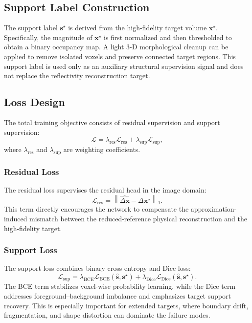 \documentclass[journal]{IEEEtran}
\begin{document}
\subsection{Support Label Construction}
\label{subsec:support_label}

The support label $\mathbf{s}^{\star}$ is derived from the high-fidelity target volume $\mathbf{x}^{\star}$. Specifically, the magnitude of $\mathbf{x}^{\star}$ is first normalized and then thresholded to obtain a binary occupancy map. A light 3-D morphological cleanup can be applied to remove isolated voxels and preserve connected target regions. This support label is used only as an auxiliary structural supervision signal and does not replace the reflectivity reconstruction target.

\subsection{Loss Design}
\label{subsec:loss_design}

The total training objective consists of residual supervision and support supervision:
\begin{equation}
\mathcal{L}
=
\lambda_{\mathrm{res}}\mathcal{L}_{\mathrm{res}}
+
\lambda_{\mathrm{sup}}\mathcal{L}_{\mathrm{sup}},
\label{eq:total_loss}
\end{equation}
where $\lambda_{\mathrm{res}}$ and $\lambda_{\mathrm{sup}}$ are weighting coefficients.

\subsubsection{Residual Loss}
The residual loss supervises the residual head in the image domain:
\begin{equation}
\mathcal{L}_{\mathrm{res}}
=
\left\|
\widehat{\Delta\mathbf{x}}
-
\Delta\mathbf{x}^{\star}
\right\|_{1}.
\label{eq:residual_loss}
\end{equation}
This term directly encourages the network to compensate the approximation-induced mismatch between the reduced-reference physical reconstruction and the high-fidelity target.

\subsubsection{Support Loss}
The support loss combines binary cross-entropy and Dice loss:
\begin{equation}
\mathcal{L}_{\mathrm{sup}}
=
\lambda_{\mathrm{BCE}}\mathcal{L}_{\mathrm{BCE}}(\widehat{\mathbf{s}},\mathbf{s}^{\star})
+
\lambda_{\mathrm{Dice}}\mathcal{L}_{\mathrm{Dice}}(\widehat{\mathbf{s}},\mathbf{s}^{\star}).
\label{eq:support_loss}
\end{equation}
The BCE term stabilizes voxel-wise probability learning, while the Dice term addresses foreground--background imbalance and emphasizes target support recovery. This is especially important for extended targets, where boundary drift, fragmentation, and shape distortion can dominate the failure modes.
\end{document}
